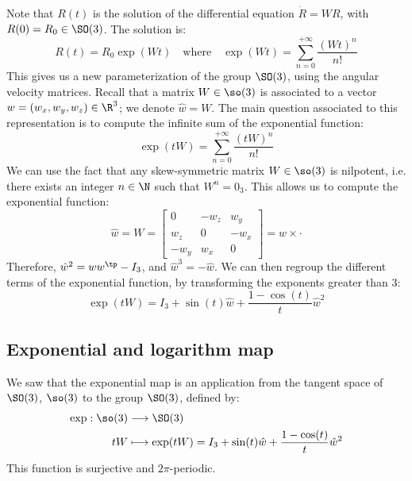 Note that $R(t)$ is the solution of the differential equation $\dot R = WR$, with $R(0)=R_0\in\SO(3)$. The solution is:
\begin{equation*}
    R(t) = R_0\exp(Wt) \quad\text{where}\quad \exp(Wt) = \sum_{n=0}^{+\infty}\frac{(Wt)^n}{n!}
\end{equation*}
This gives us a new parameterization of the group $\SO(3)$, using the angular velocity matrices. Recall that a matrix $W\in\so(3)$ is associated to a vector $w=(w_x, w_y, w_z)\in\R^3$; we denote $\hat{w}=W$. The main question associated to this representation is to compute the infinite sum of the exponential function:
\begin{equation}
    \exp(tW)=\sum_{n=0}^{+\infty}\frac{(tW)^n}{n!}
\end{equation}
We can use the fact that any skew-symmetric matrix $W\in\so(3)$ is nilpotent, i.e. there exists an integer $n\in\N$ such that $W^n=0_3$. This allows us to compute the exponential function:
\begin{equation*}
    \hat{w}=W=\begin{bmatrix}
        0 & -w_z & w_y \\
        w_z & 0 & -w_x \\
        -w_y & w_x & 0
    \end{bmatrix} = w \times \cdot
\end{equation*}
Therefore, $\hat{w}^2=ww^\tp-I_3$, and $\hat{w}^3=-\hat{w}$. We can then regroup the different terms of the exponential function, by transforming the exponents greater than 3:
\begin{equation}
    \exp(tW)=I_3+\sin(t)\hat{w}+\frac{1-\cos(t)}{t}\hat{w}^2
\end{equation}

\subsection{Exponential and logarithm map}
We saw that the exponential map is an application from the tangent space of $\SO(3)$, $\so(3)$ to the group $\SO(3)$, defined by:
\begin{align*}
    \exp:\so(3)&\longrightarrow\SO(3)\\
    tW&\longmapsto\exp(tW) = I_3 + \sin(t)\hat{w} + \frac{1-\cos(t)}{t}\hat{w}^2
\end{align*}
This function is surjective and $2\pi$-periodic.

